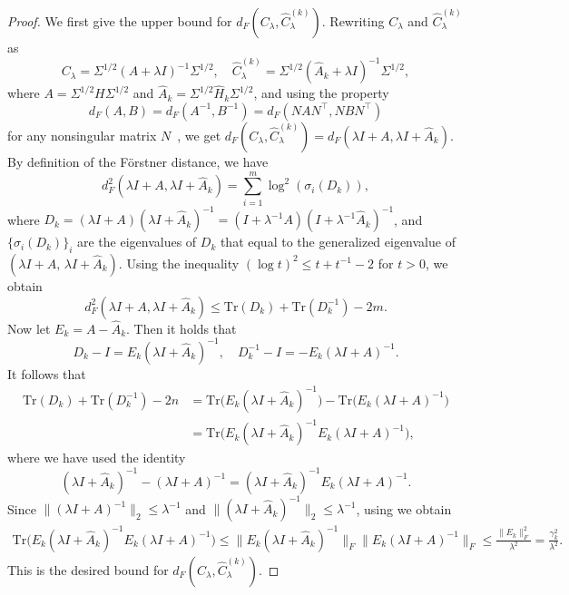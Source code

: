\documentclass[]{myarticle}
\begin{document}
\begin{proof}
  We first give the upper bound for $d_{F}(C_{\lambda},\widehat{C}_{\lambda}^{(k)})$.
  Rewriting $C_{\lambda}$ and $\widehat{C}_{\lambda}^{(k)}$ as
  \begin{equation*}
    C_{\lambda}  = \Sigma^{1/2}(A+\lambda I)^{-1}\Sigma^{1/2}, \quad
    \widehat{C}_{\lambda}^{(k)} = \Sigma^{1/2}(\widehat{A}_k+\lambda I)^{-1}\Sigma^{1/2},
  \end{equation*}
  where $A=\Sigma^{1/2}H\Sigma^{1/2}$ and $\widehat{A}_k=\Sigma^{1/2}\widehat{H}_{k}\Sigma^{1/2}$, and using the property
  \begin{equation*}
    d_{F}(A,B) = d_{F}(A^{-1},B^{-1})
    = d_{F}(NAN^{\top},NBN^{\top})
  \end{equation*}
  for any nonsingular matrix $N$~\cite{forstner2003metric}, we get $d_{F}(C_{\lambda},\widehat{C}_{\lambda}^{(k)})=d_{F}(\lambda I+A,\lambda I+\widehat{A}_k)$. By definition of the F\"orstner distance, we have 
  \begin{equation*}
    d_{F}^2(\lambda I+A, \lambda I+\widehat A_k) = \sum_{i=1}^{m} \log^2 \left(\sigma_i(D_k)\right),
  \end{equation*}
  where $D_k=(\lambda I+A)(\lambda I+\widehat A_k)^{-1}=(I+\lambda^{-1}A)(I+\lambda^{-1}\widehat{A}_{k})^{-1}$, and $\{\sigma_{i}(D_k)\}_i$ are the eigenvalues of $D_k$ that equal to the generalized eigenvalue of $(\lambda I+A, \,\lambda I+\widehat A_k)$. Using the inequality $(\log t)^2\le t+t^{-1}-2$ for $t>0$, we obtain 
  \[d_{F}^2(\lambda I+A,\lambda I+\widehat A_k) \le \mathrm{Tr}(D_k)+\mathrm{Tr}(D_k^{-1})-2m. \]
  Now let $E_k=A-\widehat A_k$. Then it holds that 
  \begin{equation*}
    D_k-I = E_k(\lambda I+\widehat A_k)^{-1}, \quad
    D_k^{-1}-I = -E_k(\lambda I+A)^{-1}.
  \end{equation*}
  It follows that
  \begin{align*}
    \mathrm{Tr}(D_k)+\mathrm{Tr}(D_k^{-1})-2n
    &= \mathrm{Tr}\!\big(E_k(\lambda I+\widehat A_k)^{-1}\big) - \mathrm{Tr}\!\big(E_k(\lambda I+A)^{-1}\big) \\
    &= \mathrm{Tr}\!\Big(E_k(\lambda I+\widehat A_k)^{-1}E_k(\lambda I+A)^{-1}\Big),
  \end{align*} 
  where we have used the identity 
  \[(\lambda I+\widehat A_k)^{-1}-(\lambda I+A)^{-1} 
  = (\lambda I+\widehat A_k)^{-1}E_k(\lambda I+A)^{-1}.\] 
  Since $\|(\lambda I+A)^{-1}\|_2\le \lambda^{-1}$ and $\|(\lambda I+\widehat A_k)^{-1}\|_2\le \lambda^{-1}$, using  we obtain 
  \begin{align*}
    \mathrm{Tr}\!\Big(E_k(\lambda I+\widehat A_k)^{-1}E_k(\lambda I+A)^{-1}\Big)
    \le \|E_k(\lambda I+\widehat A_k)^{-1}\|_F\|E_k(\lambda I+A)^{-1}\|_F 
    \le \frac{\|E_k\|_F^2}{\lambda^2} = \frac{\gamma_k^2}{\lambda^2}.
  \end{align*}
  This is the desired bound for $d_{F}(C_{\lambda},\widehat{C}_{\lambda}^{(k)})$.


\end{proof}
\end{document}
